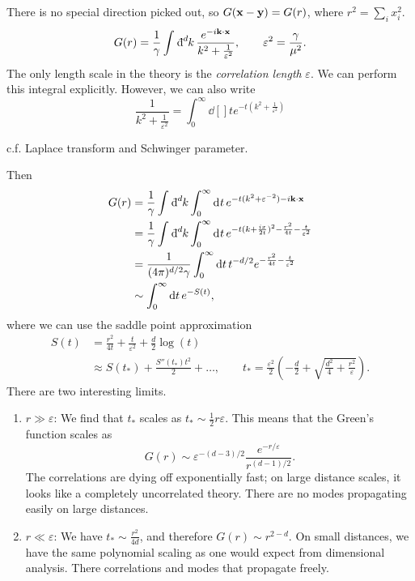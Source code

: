 There is no special direction picked out, so $G(\vb{x} - \vb{y}) = G(r)$, where $r^2 = \sum_i x_i^2$.
\begin{equation}
  G(r) = \frac{1}{\gamma} \int_{}^{} \bdd[d]{k} \frac{e^{-i \vb{k} \cdot \vb{x}}}{k^2 + \frac{1}{\varepsilon^2}}, \qquad \varepsilon^2 = \frac{\gamma}{\mu^2}.
\end{equation}
The only length scale in the theory is the \emph{correlation length} $\varepsilon$.
We can perform this integral explicitly. 
However, we can also write
\begin{equation}
  \frac{1}{k^2 + \frac{1}{\varepsilon^2}} = \int_{0}^{\infty} \dd[]{t} e^{-t (k^2 + \frac{1}{\varepsilon^2})}
\end{equation}
\begin{leftbar}
  \begin{remark}
    c.f. Laplace transform and Schwinger parameter.
  \end{remark}
\end{leftbar}
Then
\begin{align}
  G(r) &= \frac{1}{\gamma} \int_{}^{} \bdd[d]{k} \int_{0}^{\infty} \dd[]{t} e^{-t ( k^2 + \varepsilon^{-2}) - i \vb{k} \cdot \vb{x}} \\
   &= \frac{1}{\gamma} \int_{}^{} \bdd[d]{k} \int_{0}^{\infty} \dd[]{t} e^{-t ( k + \frac{i x}{2 t})^2 - \frac{r^2}{4 t} - \frac{t}{\varepsilon^2}} \\
   &= \frac{1}{(4 \pi)^{d/2} \gamma} \int_{0}^{\infty} \dd{t} t^{-d/2} e^{- \frac{r^2}{4 t} - \frac{t}{\varepsilon^2}} \\
   &\sim \int_{0}^{\infty} \dd{t} e^{-S(t)},
\end{align}
where we can use the saddle point approximation
\begin{align}
  S(t) &= \frac{r^2}{4t} + \frac{t}{\varepsilon^2} + \frac{d}{2} \log(t) \\
       &\approx S(t_*) + \frac{S''(t_*) t^2}{2} + \dots, \qquad t_* = \frac{\varepsilon^2}{2} \left( -\frac{d}{2} + \sqrt{\frac{d^2}{4} + \frac{r^2}{\varepsilon}} \right).
\end{align}
There are two interesting limits.
\begin{enumerate}
  \item $r \gg \varepsilon$: We find that $t_*$ scales as $t_* \sim \frac{1}{2} r \varepsilon$. This means that the Green's function scales as
    \begin{equation}
      G(r) \sim \varepsilon^{-(d-3)/2} \frac{e^{-r/\varepsilon}}{r^{(d-1)/2}}.
    \end{equation}
    The correlations are dying off exponentially fast; on large distance scales, it looks like a completely uncorrelated theory.
    There are no modes propagating easily on large distances.
  \item $r \ll \varepsilon$: We have $t_* \sim \frac{r^2}{4 d}$, and therefore $G(r) \sim r^{2-d}$.
    On small distances, we have the same polynomial scaling as one would expect from dimensional analysis.
    There correlations and modes that propagate freely.
\end{enumerate}
